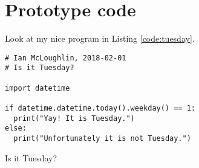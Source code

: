 \chapter{Prototype code}
Look at my nice program in Listing \ref{code:tuesday}.

\lipsum[29]

\begin{listing}[ht]
  \begin{verbatim}
# Ian McLoughlin, 2018-02-01
# Is it Tuesday?

import datetime

if datetime.datetime.today().weekday() == 1:
  print("Yay! It is Tuesday.")
else:
  print("Unfortunately it is not Tuesday.")
  \end{verbatim}
  \caption{Is it Tuesday?}
  \label{code:tuesday}
\end{listing}

\lipsum[10-15]